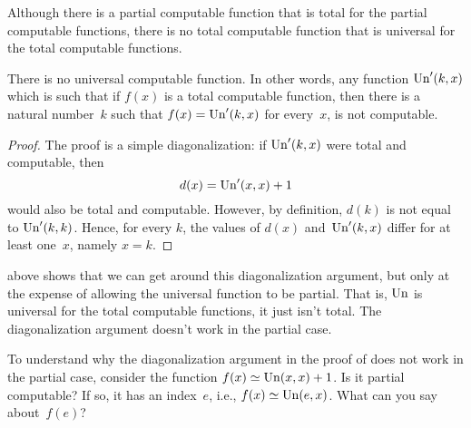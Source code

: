 \documentclass[../../../include/open-logic-section]{subfiles}
\begin{document}

Although there is a partial computable function that is total for the
partial computable functions, there is no total computable
function that is universal for the total computable functions. 

\begin{thm}
There is no universal computable function. In other words, any
function $\mathrm{Un}'(k, x)$ which is such that if $f(x)$ is a total
computable function, then there is a natural number~$k$ such that
$f(x) = \mathrm{Un}'(k,x)$ for every~$x$, is not computable.
\end{thm}

\begin{proof}
The proof is a simple diagonalization: if $\mathrm{Un}'(k,x)$ were total
and computable, then
\[
d(x) = \mathrm{Un}'(x, x) + 1
\]
would also be total and computable. However, by definition, $d(k)$ is
not equal to $\mathrm{Un}'(k,k)$. Hence, for every $k$, the values of
$d(x)$ and~$\mathrm{Un}'(k, x)$ differ for at least one~$x$, namely $x = k$.
\end{proof}

\begin{explain}
 above shows that we can get around this
diagonalization argument, but only at the expense of allowing the
universal function to be partial. That is, $\mathrm{Un}$ is universal for
the total computable functions, it just isn't total. The
diagonalization argument doesn't work in the partial case. 
\end{explain}

\begin{prob}
  To understand why the diagonalization argument in the proof of
   does not work in the partial
  case, consider the function $f(x) \simeq \mathrm{Un}(x,x)+1$. Is it
  partial computable? If so, it has an index~$e$, i.e., $f(x) \simeq
  \mathrm{Un}(e,x)$. What can you say about~$f(e)$?
\end{prob}
\end{document}
